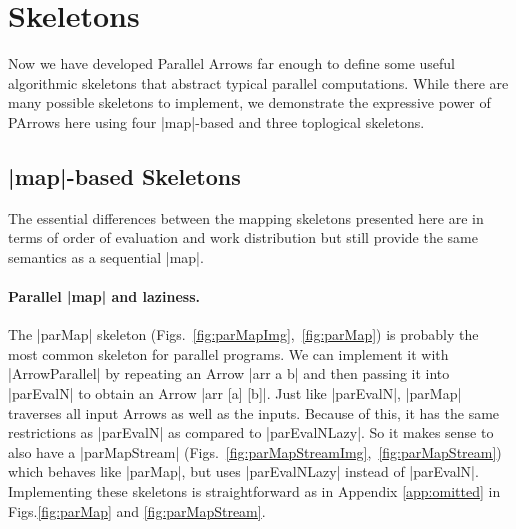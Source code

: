 \section{Skeletons}
\label{sec:skeletons}
Now we have developed Parallel Arrows far enough to define some useful algorithmic skeletons that abstract typical parallel computations. While there are many possible skeletons to implement, we demonstrate the expressive power of PArrows here using four |map|-based and three toplogical skeletons.
\subsection{|map|-based Skeletons}
\label{sec:map-skeletons}
The essential differences between the mapping skeletons presented here are in terms of order of evaluation and work distribution but still provide the same semantics as a sequential |map|.

\paragraph{Parallel |map| and laziness.}
The |parMap| skeleton (Figs.~\ref{fig:parMapImg},~\ref{fig:parMap}) is probably the most common skeleton for parallel programs. We can implement it with |ArrowParallel| by repeating an Arrow |arr a b| and then passing it into |parEvalN| to obtain an Arrow |arr [a] [b]|.
Just like |parEvalN|, |parMap| traverses all input Arrows as well as the inputs.
Because of this, it has the same restrictions as |parEvalN| as compared to |parEvalNLazy|. So it makes sense to also have a |parMapStream| (Figs.~\ref{fig:parMapStreamImg},~\ref{fig:parMapStream}) which behaves like |parMap|, but uses |parEvalNLazy| instead of |parEvalN|. Implementing these skeletons is straightforward as in Appendix \ref{app:omitted} in Figs.\ref{fig:parMap} and \ref{fig:parMapStream}.


